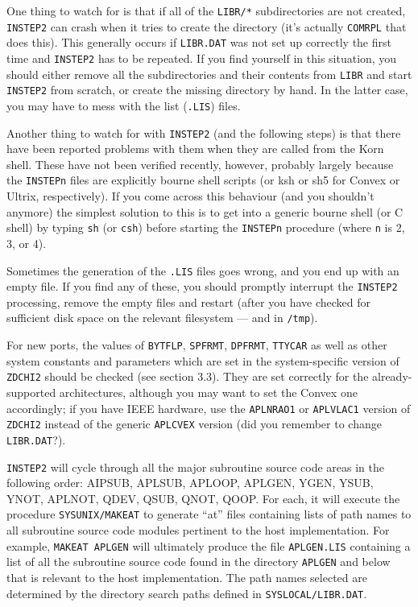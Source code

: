 One thing to watch for is that if all of the {\tt\dol LIBR/*}
subdirectories are not created, {\tt INSTEP2} can crash when it tries to
create the directory (it's actually {\tt COMRPL} that does this).  This
generally occurs if {\tt LIBR.DAT} was not set up correctly the first
time and {\tt INSTEP2} has to be repeated.  If you find yourself in this
situation, you should either remove all the subdirectories and their
contents from {\tt\dol LIBR} and start {\tt INSTEP2} from scratch, or
create the missing directory by hand.  In the latter case, you may have
to mess with the list ({\tt *.LIS}) files.

Another thing to watch for with {\tt INSTEP2} (and the following steps)
is that there have been reported problems with them when they are called
from the Korn shell.  These have not been verified recently, however,
probably largely because the {\tt INSTEPn} files are explicitly bourne
shell scripts (or ksh or sh5 for Convex or Ultrix, respectively).  If
you come across this behaviour (and you shouldn't anymore) the simplest
solution to this is to get into a generic bourne shell (or C shell) by
typing {\tt sh} (or {\tt csh}) before starting the {\tt INSTEPn}
procedure (where {\tt n} is 2, 3, or 4).

Sometimes the generation of the {\tt .LIS} files goes wrong, and you end
up with an empty file.  If you find any of these, you should promptly
interrupt the {\tt INSTEP2} processing, remove the empty files and
restart (after you have checked for sufficient disk space on the
relevant filesystem --- and in {\tt /tmp}).

For new ports, the values of {\tt BYTFLP}, {\tt SPFRMT}, {\tt DPFRMT},
{\tt TTYCAR} as well as other system constants and parameters which are
set in the system-specific version of {\tt ZDCHI2} should be checked
(see section
3.3).  They are set correctly for the already-supported architectures,
although you may want to set the Convex one accordingly; if you have
IEEE hardware, use the {\tt \dol APLNRAO1} or {\tt \dol APLVLAC1} version of
{\tt ZDCHI2} instead of the generic {\tt\dol APLCVEX} version (did you
remember to change {\tt LIBR.DAT}?).


{\tt INSTEP2} will cycle through all the major subroutine source code
areas in the following order: AIPSUB, APLSUB, APLOOP, APLGEN, YGEN,
YSUB, YNOT, APLNOT, QDEV, QSUB, QNOT, QOOP.  For each, it will execute
the procedure {\tt\dol SYSUNIX/MAKEAT} to generate ``at'' files containing
lists of path names to all subroutine source code modules pertinent to
the host implementation.  For example, {\tt MAKEAT \dol APLGEN} will
ultimately produce the file {\tt APLGEN.LIS} containing a list of all
the subroutine source code found in the directory {\tt\dol APLGEN} and
below that is relevant to the host implementation.  The path names
selected are determined by the directory search paths defined in
{\tt\dol SYSLOCAL/LIBR.DAT}.

